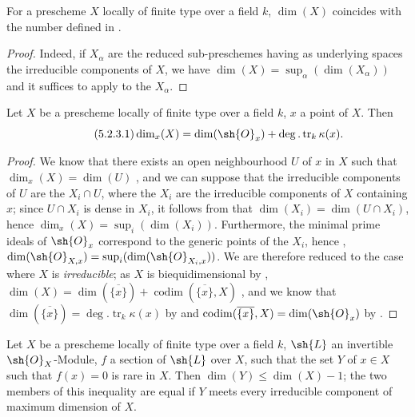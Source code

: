 \begin{corollary}[5.2.2]
\label{IV.5.2.2}
For a prescheme $X$ locally of finite type over a field $k$, $\dim(X)$ coincides with the number defined in .
\end{corollary}

\begin{proof}
Indeed, if $X_\alpha$ are the reduced sub-preschemes having as underlying spaces the irreducible components of $X$, we have $\dim(X)=\sup_\alpha(\dim(X_\alpha))$  and it suffices to apply  to the $X_\alpha$.
\end{proof}

\begin{corollary}[5.2.3]
\label{IV.5.2.3}
Let $X$ be a prescheme locally of finite type over a field $k$, $x$ a point of $X$.
Then
\[
\tag{5.2.3.1}\label{IV.5.2.3.1}
  \dim_x(X) = \dim(\sh{O}_x) + \deg.\operatorname{tr}_k\kappa(x).
\]
\end{corollary}

\begin{proof}
We know that there exists an open neighbourhood $U$ of $x$ in $X$ such that $\dim_x(X)=\dim(U)$ , and we can suppose that the irreducible components of $U$ are the $X_i\cap U$, where the $X_i$ are the irreducible components of $X$ containing $x$; since $U\cap X_i$ is dense in $X_i$, it follows from  that $\dim(X_i)=\dim(U\cap X_i)$, hence $\dim_x(X)=\sup_i(\dim(X_i))$.
Furthermore, the minimal prime ideals of $\sh{O}_x$ correspond to the generic points of the $X_i$, hence , $\dim(\sh{O}_{X,x})=\sup_i(\dim(\sh{O}_{X_i,x}))$.
We are therefore reduced to the case where $X$ is \emph{irreducible}; as $X$ is biequidimensional by , $\dim(X)=\dim(\overline{\{x\}})+\operatorname{codim}(\overline{\{x\}},X)$ , and we know that $\dim(\overline{\{x\}})=\deg.\operatorname{tr}_k\kappa(x)$ by  and $\operatorname{codim}(\overline{\{x\}},X)=\dim(\sh{O}_x)$ by .
\end{proof}

\begin{corollary}[5.2.4]
\label{IV.5.2.4}
Let $X$ be a prescheme locally of finite type over a field $k$, $\sh{L}$ an invertible $\sh{O}_X$-Module, $f$ a section of $\sh{L}$ over $X$, such that the set $Y$ of $x\in X$ such that $f(x)=0$ is rare in $X$.
Then $\dim(Y)\leq\dim(X)-1$; the two members of this inequality are equal if $Y$ meets every irreducible component of maximum dimension of $X$.
\end{corollary}

